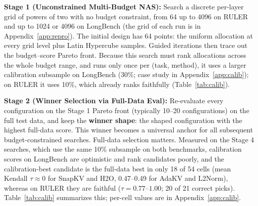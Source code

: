 \documentclass[11pt]{article}
\begin{document}
\textbf{Stage 1 (Unconstrained Multi-Budget NAS):} Search a discrete per-layer grid of powers of two with no budget constraint, from 64 up to 4096 on RULER and up to 1024 or 4096 on LongBench (the grid of each run is in Appendix~\ref{app:repro}). The initial design has 64 points: the uniform allocation at every grid level plus Latin Hypercube samples. Guided iterations then trace out the budget--score Pareto front. Because this search must rank allocations across the whole budget range, and runs only once per (task, method), it uses a larger calibration subsample on LongBench (30\%; case study in Appendix~\ref{app:calib}); on RULER it uses 10\%, which already ranks faithfully (Table~\ref{tab:calib}).

\textbf{Stage 2 (Winner Selection via Full-Data Eval):} Re-evaluate every configuration on the Stage 1 Pareto front (typically 10--20 configurations) on the full test data, and keep the \textbf{winner shape}: the shaped configuration with the highest full-data score. This winner becomes a universal anchor for all subsequent budget-constrained searches. Full-data selection matters. Measured on the Stage 4 searches, which use the same 10\% subsample on both benchmarks, calibration scores on LongBench are optimistic and rank candidates poorly, and the calibration-best candidate is the full-data best in only 18 of 54 cells (mean Kendall $\tau \approx 0$ for SnapKV and H2O, 0.47--0.49 for AdaKV and L2Norm), whereas on RULER they are faithful ($\tau = 0.77$--$1.00$; 20 of 21 correct picks). Table~\ref{tab:calib} summarizes this; per-cell values are in Appendix~\ref{app:calib}.
\end{document}
